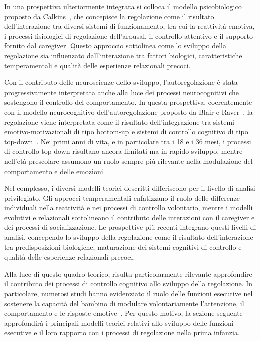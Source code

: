        In una prospettiva ulteriormente integrata si colloca il modello psicobiologico proposto da Calkins~\cite{calkins2007}, che concepisce la regolazione come il risultato dell'interazione tra diversi sistemi di funzionamento, tra cui la reattività emotiva, i processi fisiologici di regolazione dell'arousal, il controllo attentivo e il supporto fornito dal caregiver. Questo approccio sottolinea come lo sviluppo della regolazione sia influenzato dall'interazione tra fattori biologici, caratteristiche temperamentali e qualità delle esperienze relazionali precoci.

        Con il contributo delle neuroscienze dello sviluppo, l'autoregolazione è stata progressivamente interpretata anche alla luce dei processi neurocognitivi che sostengono il controllo del comportamento. In questa prospettiva, coerentemente con il modello neurocognitivo dell'autoregolazione proposto da Blair e Raver~\cite{blair2015}, la regolazione viene interpretata come il risultato dell'integrazione tra sistemi emotivo-motivazionali di tipo bottom-up e sistemi di controllo cognitivo di tipo top-down~\cite{ursache2012}. Nei primi anni di vita, e in particolare tra i 18 e i 36 mesi, i processi di controllo top-down risultano ancora limitati ma in rapido sviluppo, mentre nell'età prescolare assumono un ruolo sempre più rilevante nella modulazione del comportamento e delle emozioni.

        Nel complesso, i diversi modelli teorici descritti differiscono per il livello di analisi privilegiato. Gli approcci temperamentali enfatizzano il ruolo delle differenze individuali nella reattività e nei processi di controllo volontario, mentre i modelli evolutivi e relazionali sottolineano il contributo delle interazioni con il caregiver e dei processi di socializzazione. Le prospettive più recenti integrano questi livelli di analisi, concependo lo sviluppo della regolazione come il risultato dell'interazione tra predisposizioni biologiche, maturazione dei sistemi cognitivi di controllo e qualità delle esperienze relazionali precoci.

        Alla luce di questo quadro teorico, risulta particolarmente rilevante approfondire il contributo dei processi di controllo cognitivo allo sviluppo della regolazione. In particolare, numerosi studi hanno evidenziato il ruolo delle funzioni esecutive nel sostenere la capacità del bambino di modulare volontariamente l'attenzione, il comportamento e le risposte emotive~\cite{diamond2013}. Per questo motivo, la sezione seguente approfondirà i principali modelli teorici relativi allo sviluppo delle funzioni esecutive e il loro rapporto con i processi di regolazione nella prima infanzia.

